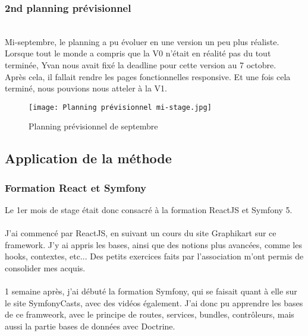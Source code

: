 \subsubsection{2nd planning prévisionnel}
~\\
Mi-septembre, le planning a pu évoluer en une version un peu plus réaliste.\\
Lorsque tout le monde a compris que la V0 n'était en réalité pas du tout terminée, Yvan nous avait fixé la deadline pour cette version au 7 octobre.
\\Après cela, il fallait rendre les pages fonctionnelles responsive. Et une fois cela terminé, nous pouvions nous atteler à la V1.

\begin{figure}[H]
    \centering
    \texttt{[image: Planning prévisionnel mi-stage.jpg]}
    \caption{Planning prévisionnel de septembre}
\end{figure}

\pagebreak
\subsection{Application de la méthode}

\subsubsection{Formation React et Symfony}

Le 1er mois de stage était donc consacré à la formation ReactJS et Symfony 5.\\\\
J'ai commencé par ReactJS, en suivant un cours du site Graphikart sur ce framework. 
J'y ai appris les bases, ainsi que des notions plus avancées, comme les hooks, contextes, etc...
Des petits exercices faits par l'association m'ont permis de consolider mes acquis.\\\\

1 semaine après, j'ai débuté la formation Symfony, qui se faisait quant à elle sur le site SymfonyCasts, avec des vidéos également.
J'ai donc pu apprendre les bases de ce framweork, avec le principe de routes, services, bundles, contrôleurs, mais aussi la partie bases de données avec Doctrine.\\\\

